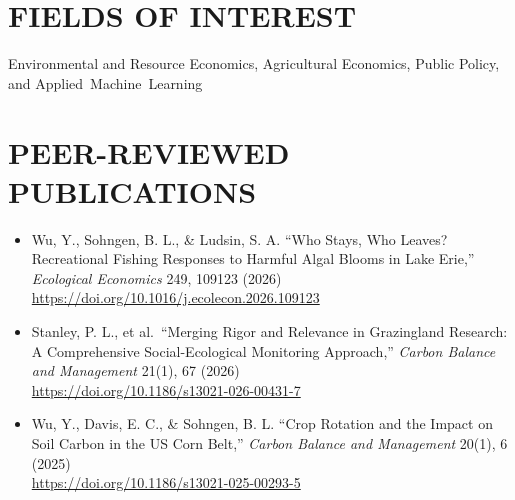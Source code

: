 \documentclass[letterpaper,11pt]{article}
\begin{document}
\section{FIELDS OF INTEREST}

\begingroup
\setlength{\emergencystretch}{2em}
Environmental and Resource Economics, Agricultural Economics, Public Policy, and Applied~Machine~Learning
\par\endgroup

\section{PEER-REVIEWED PUBLICATIONS}
\begin{itemize}[leftmargin=1em, itemsep=4pt]
    \item[\small\textbullet] Wu, Y., Sohngen, B. L., \& Ludsin, S. A. ``Who Stays, Who Leaves? Recreational Fishing Responses to Harmful Algal Blooms in Lake Erie,'' \textit{Ecological Economics} 249, 109123 (2026) \\
    \href{https://doi.org/10.1016/j.ecolecon.2026.109123}{https://doi.org/10.1016/j.ecolecon.2026.109123}
    \item[\small\textbullet] Stanley, P. L., et al.\ ``Merging Rigor and Relevance in Grazingland Research: A Comprehensive Social-Ecological Monitoring Approach,'' \textit{Carbon Balance and Management} 21(1), 67 (2026) \\
    \href{https://doi.org/10.1186/s13021-026-00431-7}{https://doi.org/10.1186/s13021-026-00431-7}
    \item[\small\textbullet] Wu, Y., Davis, E. C., \& Sohngen, B. L. ``Crop Rotation and the Impact on Soil Carbon in the US Corn Belt,'' \textit{Carbon Balance and Management} 20(1), 6 (2025) \\
    \href{https://doi.org/10.1186/s13021-025-00293-5}{https://doi.org/10.1186/s13021-025-00293-5}
\end{itemize}


\end{document}
